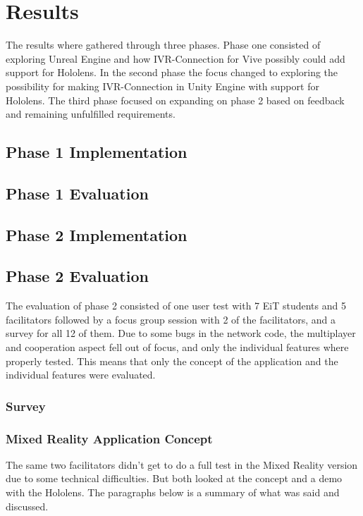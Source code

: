 \chapter{Results}
 The results where gathered through three phases. Phase one consisted of exploring Unreal Engine and how IVR-Connection for Vive possibly could add support for Hololens. In the second phase the focus changed to exploring the possibility for making IVR-Connection in Unity Engine with support for Hololens. The third phase focused on expanding on phase 2 based on feedback and remaining unfulfilled requirements.
 
    \section{Phase 1 Implementation} %
    
    \section{Phase 1 Evaluation} %
    
    \section{Phase 2 Implementation} %
    
    \section{Phase 2 Evaluation}
    The evaluation of phase 2 consisted of one user test with 7 EiT students and 5 facilitators followed by a focus group session with 2 of the facilitators, and a survey for all 12 of them.
    Due to some bugs in the network code, the multiplayer and cooperation aspect fell out of focus, and only the individual features where properly tested. This means that only the concept of the application and the individual features were evaluated.
    
        \subsection{Survey} %
        
        \subsection{Mixed Reality Application Concept} %
        The same two facilitators didn't get to do a full test in the Mixed Reality version due to some technical difficulties. But both looked at the concept and a demo with the Hololens. The paragraphs below is a summary of what was said and discussed.
        
